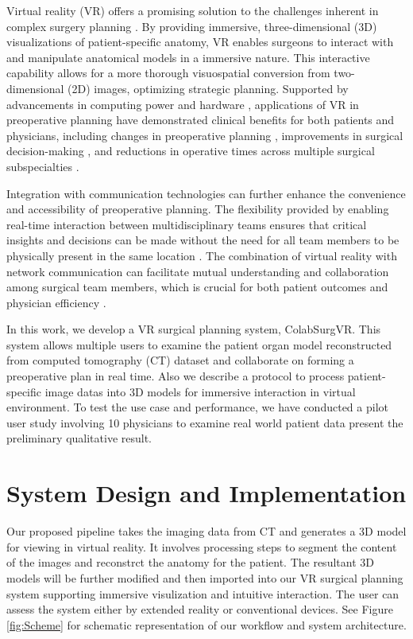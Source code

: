 \documentclass[sn-mathphys-num]{sn-jnl}%
\theoremstyle{thmstyleone}%
\theoremstyle{thmstyletwo}%
\theoremstyle{thmstylethree}%
\begin{document}
Virtual reality (VR) offers a promising solution to the challenges inherent in complex surgery planning \cite{RN32, RN31, RN2, RN24}. By providing immersive, three-dimensional (3D) visualizations of patient-specific anatomy, VR enables surgeons to interact with and manipulate anatomical models in a immersive nature. This interactive capability allows for a more thorough visuospatial conversion from two-dimensional (2D) images, optimizing strategic planning. Supported by advancements in computing power and hardware \cite{RN33}, applications of VR in preoperative planning have demonstrated clinical benefits for both patients and physicians, including changes in preoperative planning \cite{RN17, RN13, RN37, RN10, RN44, RN29}, improvements in surgical decision-making \cite{RN5}, and reductions in operative times \cite{RN36, RN28} across multiple surgical subspecialties \cite{RN38, RN2}.

Integration with communication technologies can further enhance the convenience and accessibility of preoperative planning. The flexibility provided by enabling real-time interaction between multidisciplinary teams ensures that critical insights and decisions can be made without the need for all team members to be physically present in the same location \cite{RN26, RN6}. The combination of virtual reality with network communication can facilitate mutual understanding and collaboration among surgical team members, which is crucial for both patient outcomes and physician efficiency \cite{RN62, RN25}.

In this work, we develop a VR surgical planning system, ColabSurgVR. This system allows multiple users to examine the patient organ model reconstructed from computed tomography (CT) dataset and collaborate on forming a preoperative plan in real time. Also we describe a protocol to process patient-specific image datas into 3D models for immersive interaction in virtual environment. To test the use case and performance, we have conducted a pilot user study involving 10 physicians to examine real world patient data present the preliminary qualitative result.

\section{System Design and Implementation}
Our proposed pipeline takes the imaging data from CT and generates a 3D model for viewing in virtual reality. It involves processing steps to segment the content of the images and reconstrct the anatomy for the patient. The resultant 3D models will be further modified and then imported into our VR surgical planning system supporting immersive visulization and intuitive interaction. The user can assess the system either by extended reality or conventional devices. See Figure \ref{fig:Scheme} for schematic representation of our workflow and system architecture.
\end{document}
